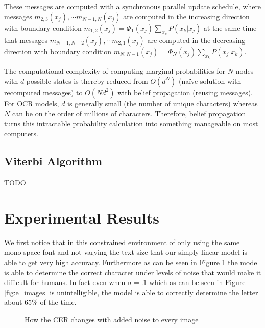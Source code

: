 \documentclass[10pt,twocolumn,letterpaper]{article}
\begin{document}
These messages are computed with a synchronous parallel update schedule,
where messages $m_{2, 3}(x_j), \cdots m_{N - 1, N}(x_j)$ are computed in
the increasing direction with boundary condition
$m_{1, 2}(x_j) = \Phi_1(x_j) \sum_{x_k} P(x_k | x_j)$ at the same time that
messages $m_{N - 1, N - 2}(x_j), \cdots m_{2, 1}(x_j)$ are computed in
the decreasing direction with boundary condition
$m_{N, N - 1}(x_j) = \Phi_N(x_j) \sum_{x_k} P(x_j | x_k)$.

The computational complexity of computing marginal probabilities for
$N$ nodes with $d$ possible states is thereby reduced from $O(d^N)$
(na\"{i}ve solution with recomputed messages) to $O(Nd^2)$ with
belief propagation (reusing messages). For OCR models, $d$ is
generally small (the number of unique characters) whereas $N$
can be on the order of millions of characters. Therefore, belief
propagation turns this intractable probability calculation into
something manageable on most computers.

\subsection{Viterbi Algorithm}

TODO



\section{Experimental Results}
\label{exp_results}
We first notice that in this constrained environment of only using the same mono-space font and not varying the text size that our simply linear model is able to get very high accuracy.  Furthermore as can be seen in Figure \ref{fig:CER} the model is able to determine the correct character under levels of noise that would make it difficult for humans.  In fact even when $\sigma = .1$ which as can be seen in Figure \ref{fig:e_images} is unintelligible, the model is able to correctly determine the letter about 65\% of the time. 

\begin{figure}
\caption{\label{fig:CER}How the CER changes with added noise to every image}
\end{figure}
\end{document}

